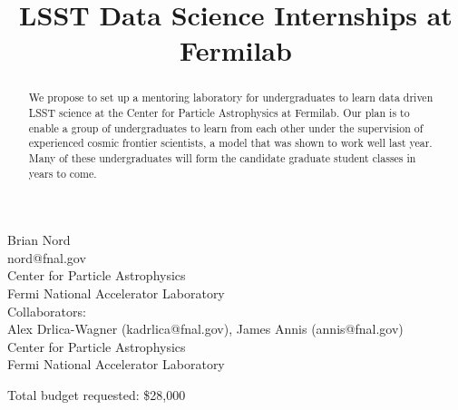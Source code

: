 \title{%
LSST Data Science Internships at Fermilab}
\date{} %


\maketitle

\vspace{-1.5cm}
\begin{center}
Brian Nord \\ nord@fnal.gov \\
Center for Particle Astrophysics\\
Fermi National Accelerator Laboratory\\
\vspace{0.3cm}
Collaborators: \\
Alex Drlica-Wagner (kadrlica@fnal.gov), James Annis (annis@fnal.gov)\\
Center for Particle Astrophysics\\
Fermi National Accelerator Laboratory
\end{center}
\vspace{1.5cm}

\begin{abstract}
\normalsize
We propose to set up a mentoring laboratory for undergraduates to
learn data driven LSST science at the Center for Particle
Astrophysics at Fermilab.
Our plan is to enable a group of undergraduates to learn from
each other under the supervision of experienced cosmic
frontier scientists, a model that was shown to work
well last year. Many of these  undergraduates will
form the candidate graduate student classes in years to come.
\end{abstract}

Total budget requested: \$28,000\par

